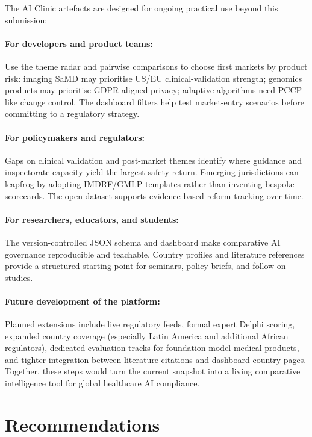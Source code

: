 \documentclass[12pt,a4paper]{report}
\begin{document}
The AI Clinic artefacts are designed for ongoing practical use beyond this submission:

\paragraph{For developers and product teams:}
Use the theme radar and pairwise comparisons to choose first markets by product risk: imaging SaMD may prioritise US/EU clinical-validation strength; genomics products may prioritise GDPR-aligned privacy; adaptive algorithms need PCCP-like change control. The dashboard filters help test market-entry scenarios before committing to a regulatory strategy.

\paragraph{For policymakers and regulators:}
Gaps on clinical validation and post-market themes identify where guidance and inspectorate capacity yield the largest safety return. Emerging jurisdictions can leapfrog by adopting IMDRF/GMLP templates rather than inventing bespoke scorecards. The open dataset supports evidence-based reform tracking over time.

\paragraph{For researchers, educators, and students:}
The version-controlled JSON schema and dashboard make comparative AI governance reproducible and teachable. Country profiles and literature references provide a structured starting point for seminars, policy briefs, and follow-on studies.

\paragraph{Future development of the platform:}
Planned extensions include live regulatory feeds, formal expert Delphi scoring, expanded country coverage (especially Latin America and additional African regulators), dedicated evaluation tracks for foundation-model medical products, and tighter integration between literature citations and dashboard country pages. Together, these steps would turn the current snapshot into a living comparative intelligence tool for global healthcare AI compliance.

\section{Recommendations}
\end{document}
